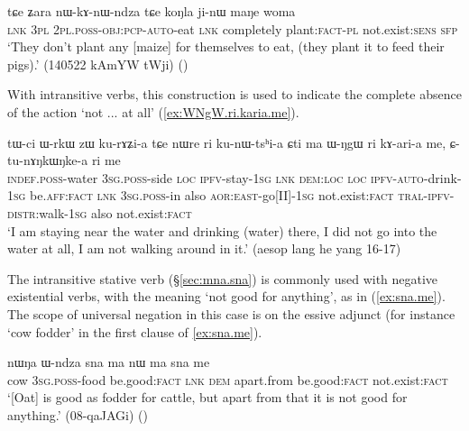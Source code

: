 \begin{exe}
\ex \label{ex:jinW.maNe}
\gll tɕe ʑara nɯ-kɤ-nɯ-ndza tɕe koŋla ji-nɯ maŋe woma \\
\textsc{lnk} \textsc{3pl} \textsc{2pl}.\textsc{poss}-\textsc{obj}:\textsc{pcp}-\textsc{auto}-eat \textsc{lnk} completely plant:\textsc{fact}-\textsc{pl} not.exist:\textsc{sens} \textsc{sfp} \\
\glt `They don't  plant any [maize] for themselves to  eat, (they plant it to feed their pigs).'  (140522 kAmYW tWji)
()
\end{exe}

With intransitive verbs, this construction is used to indicate the complete absence of the action `not ... at all' (\ref{ex:WNgW.ri.karia.me}).

\begin{exe}
\ex \label{ex:WNgW.ri.karia.me} 
\gll  tɯ-ci ɯ-rkɯ zɯ ku-rɤʑi-a tɕe nɯre ri ku-nɯ-tsʰi-a ɕti ma ɯ-ŋgɯ ri kɤ-ari-a me, ɕ-tu-nɤŋkɯŋke-a ri me \\
\textsc{indef}.\textsc{poss}-water \textsc{3sg}.\textsc{poss}-side \textsc{loc} \textsc{ipfv}-stay-\textsc{1sg} \textsc{lnk} \textsc{dem}:\textsc{loc} \textsc{loc} \textsc{ipfv}-\textsc{auto}-drink-\textsc{1sg} be.\textsc{aff}:\textsc{fact} \textsc{lnk} \textsc{3sg}.\textsc{poss}-in also \textsc{aor}:\textsc{east}-go[II]-\textsc{1sg} not.exist:\textsc{fact} \textsc{tral}-\textsc{ipfv}-\textsc{distr}:walk-\textsc{1sg} also not.exist:\textsc{fact} \\
\glt `I am staying near the water and drinking (water) there, I did not go into the water at all, I am not walking around in it.' (aesop lang he yang 16-17)
\end{exe}

The intransitive stative verb  (§\ref{sec:mna.sna}) is commonly used with negative existential verbs, with the meaning `not good for anything', as in (\ref{ex:sna.me}). The scope of universal negation in this case is on the essive adjunct (for instance  `cow fodder' in the first clause of \ref{ex:sna.me}).

\begin{exe}
\ex \label{ex:sna.me} 
\gll nɯŋa ɯ-ndza sna ma nɯ ma sna me \\
cow \textsc{3sg}.\textsc{poss}-food be.good:\textsc{fact} \textsc{lnk} \textsc{dem} apart.from be.good:\textsc{fact} not.exist:\textsc{fact} \\
\glt `[Oat] is good as fodder for cattle, but apart from that it is not good for anything.' (08-qaJAGi)
()
\end{exe}

